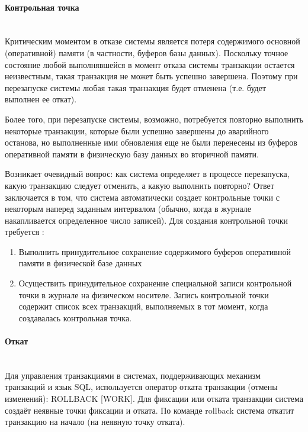 \paragraph{Контрольная точка} ~\\

Критическим моментом в отказе системы является потеря содержимого основной (оперативной) памяти (в частности, буферов базы данных). Поскольку точное состояние любой выполнявшейся в момент отказа системы транзакции остается неизвестным, такая транзакция не может быть успешно завершена. Поэтому при перезапуске системы любая такая транзакция будет отменена (т.е. будет выполнен ее откат). 


Более того, при перезапуске системы, возможно, потребуется повторно выполнить некоторые транзакции, которые были успешно завершены до аварийного останова, но выполненные ими обновления еще не были перенесены из буферов оперативной памяти в физическую базу данных во вторичной памяти.


Возникает очевидный вопрос: как система определяет в процессе перезапуска, какую транзакцию следует отменить, а какую выполнить повторно? Ответ заключается в том, что система автоматически создает контрольные точки с некоторым наперед заданным интервалом (обычно, когда в журнале накапливается определенное число записей). Для создания контрольной точки требуется \autocite{Date2005}:

\begin{enumerate}
    \item Выполнить принудительное сохранение содержимого буферов оперативной памяти в физической базе данных 
    \item Осуществить принудительное сохранение специальной записи контрольной точки в журнале на физическом носителе. Запись контрольной точки содержит список всех транзакций, выполняемых в тот момент, когда создавалась контрольная точка.
\end{enumerate}

\paragraph{Откат} ~\\

Для управления транзакциями в системах, поддерживающих механизм транзакций и язык SQL, используется оператор отката транзакции (отмены изменений): ROLLBACK [WORK]. Для фиксации или отката транзакции система создаёт неявные точки фиксации и отката. По команде rollback система откатит транзакцию на начало (на неявную точку отката).

